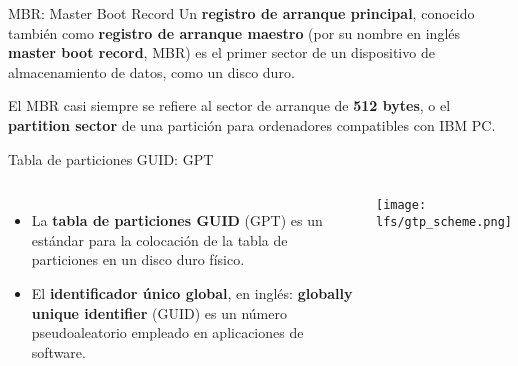 \begin{frame}[c]{MBR: Master Boot Record}
  Un \textbf{registro de arranque principal}, conocido también como
  \textbf{registro de arranque maestro} (por su nombre en inglés
  \textbf{master boot record}, MBR) es el
  primer sector de un dispositivo de almacenamiento de datos, como un disco
  duro.

  \vspace{\baselineskip}
  El MBR casi siempre se refiere al sector de arranque de \textbf{512 bytes},
  o el \textbf{partition sector} de una partición para ordenadores
  compatibles con IBM PC.

  \vspace{\baselineskip}
  \begin{center}
  \end{center}
\end{frame}

\begin{frame}[c]{Tabla de particiones GUID: GPT}
  \begin{columns}
    \begin{itemize}
      \item La \textbf{tabla de particiones GUID} (GPT) es un estándar para la
            colocación de la tabla de particiones en un disco duro físico.
      \item El \textbf{identificador único global}, en inglés:
            \textbf{globally unique identifier} (GUID) es un número
            pseudoaleatorio empleado en aplicaciones de software.
    \end{itemize}
      \begin{center}
        \texttt{[image: lfs/gtp\_scheme.png]}
      \end{center}
  \end{columns}
\end{frame}

